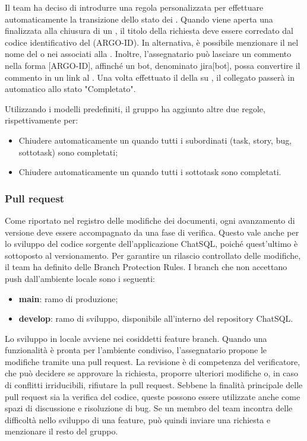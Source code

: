 \vspace{0.5\baselineskip}
\par Il team ha deciso di introdurre una regola personalizzata per effettuare automaticamente la transizione dello stato dei . Quando viene aperta una  finalizzata alla chiusura di un , il titolo della richiesta deve essere corredato dal codice identificativo del  (ARGO-ID). In alternativa, è possibile menzionare il  nel nome del  o nei  associati alla . Inoltre, l’assegnatario può lasciare un commento nella forma [ARGO-ID], affinché un bot, denominato jira[bot], possa convertire il commento in un link al  . Una volta effettuato il  della  su , il  collegato passerà in automatico allo stato "Completato".
\par Utilizzando i modelli predefiniti, il gruppo ha aggiunto altre due regole, rispettivamente per:
\begin{itemize}
  \item Chiudere automaticamente un  quando tutti i  subordinati (task, story, bug, sottotask) sono completati;
  \item Chiudere automaticamente un  quando tutti i sottotask sono completati.
\end{itemize}

\subsubsection{Pull request} \label{sec:pull_request}
Come riportato nel registro delle modifiche dei documenti, ogni avanzamento di versione deve essere accompagnato da una fase di verifica. Questo vale anche per lo sviluppo del codice sorgente dell'applicazione ChatSQL, poiché quest'ultimo è sottoposto al versionamento. Per garantire un rilascio controllato delle modifiche, il team ha definito delle Branch Protection Rules. I branch che non accettano push dall’ambiente locale sono i seguenti: 
\begin{itemize}
  \item \textbf{main}: ramo di produzione;
  \item \textbf{develop}: ramo di sviluppo, disponibile all'interno del repository ChatSQL.
\end{itemize}
\par Lo sviluppo in locale avviene nei cosiddetti feature branch. Quando una funzionalità è pronta per l'ambiente condiviso, l'assegnatario propone le modifiche tramite una pull request. La revisione è di competenza del verificatore, che può decidere se approvare la richiesta, proporre ulteriori modifiche o, in caso di conflitti irriducibili, rifiutare la pull request. Sebbene la finalità principale delle pull request sia la verifica del codice, queste possono essere utilizzate anche come spazi di discussione e risoluzione di bug. Se un membro del team incontra delle difficoltà nello sviluppo di una feature, può quindi inviare una richiesta e menzionare il resto del gruppo.

